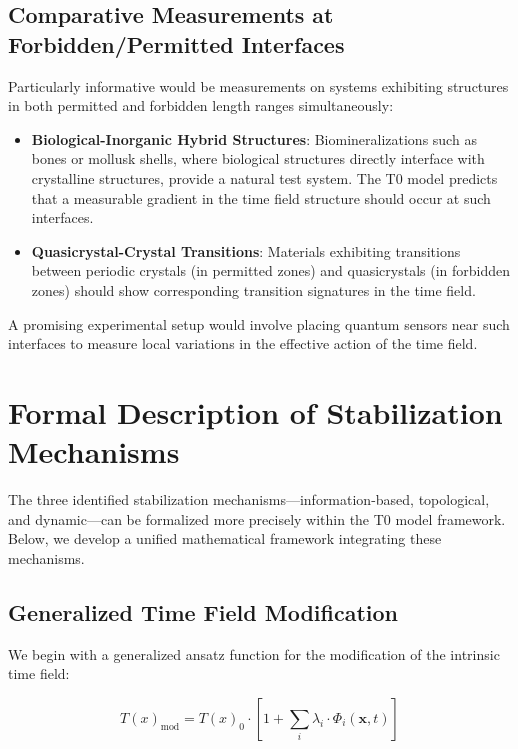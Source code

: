 \documentclass[12pt,a4paper]{article}
\newcommand{\Tfield}{T(x)}
\begin{document}
	\subsection{Comparative Measurements at Forbidden/Permitted Interfaces}
	\label{subsec:grenzflaechen_messungen}
	
	Particularly informative would be measurements on systems exhibiting structures in both permitted and forbidden length ranges simultaneously:
	
	\begin{itemize}
		\item \textbf{Biological-Inorganic Hybrid Structures}: Biomineralizations such as bones or mollusk shells, where biological structures directly interface with crystalline structures, provide a natural test system. The T0 model predicts that a measurable gradient in the time field structure should occur at such interfaces.
		
		\item \textbf{Quasicrystal-Crystal Transitions}: Materials exhibiting transitions between periodic crystals (in permitted zones) and quasicrystals (in forbidden zones) should show corresponding transition signatures in the time field.
	\end{itemize}
	
	A promising experimental setup would involve placing quantum sensors near such interfaces to measure local variations in the effective action of the time field.
	
	\section{Formal Description of Stabilization Mechanisms}
	\label{sec:formale_beschreibung}
	
	The three identified stabilization mechanisms—information-based, topological, and dynamic—can be formalized more precisely within the T0 model framework. Below, we develop a unified mathematical framework integrating these mechanisms.
	
	\subsection{Generalized Time Field Modification}
	\label{subsec:zeitfeld_modifikation}
	
	We begin with a generalized ansatz function for the modification of the intrinsic time field:
	
	\begin{equation}
		\Tfield_{\text{mod}} = \Tfield_0 \cdot \left[ 1 + \sum_i \lambda_i \cdot \Phi_i(\mathbf{x}, t) \right]
	\end{equation}
	
\end{document}
